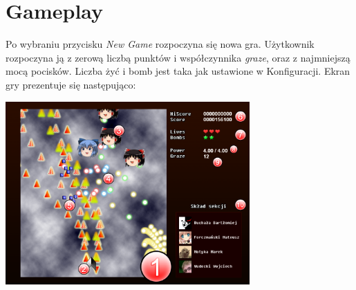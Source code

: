 	\section{Gameplay}
		Po wybraniu przycisku \emph{New Game} rozpoczyna się nowa gra. Użytkownik rozpoczyna ją z zerową liczbą punktów i współczynnika \emph{graze}, oraz z najmniejszą mocą pocisków. Liczba żyć i bomb jest taka jak ustawione w Konfiguracji. Ekran gry prezentuje się następująco:
		\begin{center}
			\includegraphics[width=0.7\textwidth]{./images/gameplay_clear}
		\end{center}
